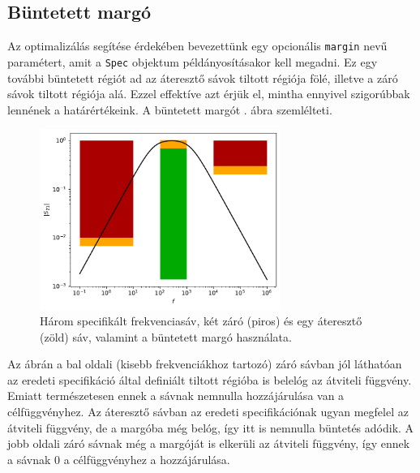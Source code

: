     \subsection{Büntetett margó}
        Az optimalizálás segítése érdekében bevezettünk egy opcionális \verb|margin| nevű paramétert, amit a \verb|Spec| objektum példányosításakor kell megadni. Ez egy további büntetett régiót ad az áteresztő sávok tiltott régiója fölé, illetve a záró sávok tiltott régiója alá. Ezzel effektíve azt érjük el, mintha ennyivel szigorúbbak lennének a határértékeink. A büntetett margót . ábra szemlélteti.
        \begin{figure}[h!]
            \centering
            \includegraphics[width=0.7\textwidth]{atvitel_pelda.pdf}
            \caption{Három specifikált frekvenciasáv, két záró (piros) és egy áteresztő (zöld) sáv, valamint a büntetett margó használata.}
            \label{fig:margin}
        \end{figure}
        Az ábrán a bal oldali (kisebb frekvenciákhoz tartozó) záró sávban jól láthatóan az eredeti specifikáció által definiált tiltott régióba is belelóg az átviteli függvény. Emiatt természetesen ennek a sávnak nemnulla hozzájárulása van a célfüggvényhez. Az áteresztő sávban az eredeti specifikációnak ugyan megfelel az átviteli függvény, de a margóba még belóg, így itt is nemnulla büntetés adódik. A jobb oldali záró sávnak még a margóját is elkerüli az átviteli függvény, így ennek a sávnak 0 a célfüggvényhez a hozzájárulása.

